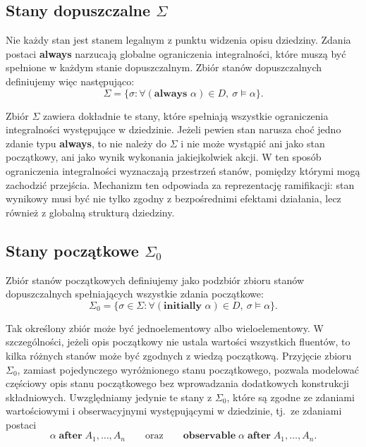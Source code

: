 \documentclass[11pt,a4paper]{article}
\theoremstyle{definition}
\begin{document}
\subsection{Stany dopuszczalne \texorpdfstring{$\Sigma$}{Sigma}}
\label{sec:stany-dopuszczalne}

Nie każdy stan jest stanem legalnym z punktu widzenia opisu dziedziny. Zdania postaci \textbf{always} narzucają globalne ograniczenia integralności, które muszą być spełnione w każdym stanie dopuszczalnym. Zbiór stanów dopuszczalnych definiujemy więc następująco:
\[
\Sigma = \{\sigma : \forall (\textbf{always }\alpha)\in D,\ \sigma \models \alpha\}.
\]

Zbiór $\Sigma$ zawiera dokładnie te stany, które spełniają wszystkie ograniczenia integralności występujące w dziedzinie. Jeżeli pewien stan narusza choć jedno zdanie typu \textbf{always}, to nie należy do $\Sigma$ i nie może wystąpić ani jako stan początkowy, ani jako wynik wykonania jakiejkolwiek akcji. W ten sposób ograniczenia integralności wyznaczają przestrzeń stanów, pomiędzy którymi mogą zachodzić przejścia. Mechanizm ten odpowiada za reprezentację ramifikacji: stan wynikowy musi być nie tylko zgodny z bezpośrednimi efektami działania, lecz również z globalną strukturą dziedziny.

\subsection{Stany początkowe \texorpdfstring{$\Sigma_0$}{Sigma\_0}}
\label{sec:stany-poczatkowe}

Zbiór stanów początkowych definiujemy jako podzbiór zbioru stanów dopuszczalnych spełniających wszystkie zdania początkowe:
\[
\Sigma_0 = \{\sigma \in \Sigma : \forall (\textbf{initially }\alpha)\in D,\ \sigma \models \alpha\}.
\]

Tak określony zbiór może być jednoelementowy albo wieloelementowy. W szczególności, jeżeli opis początkowy nie ustala wartości wszystkich fluentów, to kilka różnych stanów może być zgodnych z wiedzą początkową. Przyjęcie zbioru $\Sigma_0$, zamiast pojedynczego wyróżnionego stanu początkowego, pozwala modelować częściowy opis stanu początkowego bez wprowadzania dodatkowych konstrukcji składniowych. Uwzględniamy jedynie te stany z $\Sigma_0$, które są zgodne ze zdaniami wartościowymi i obserwacyjnymi występującymi w dziedzinie, tj.\ ze zdaniami postaci
\[
\alpha \;\textbf{after}\; A_1,\dots,A_n
\qquad\text{oraz}\qquad
\textbf{observable}\; \alpha \;\textbf{after}\; A_1,\dots,A_n.
\]
\end{document}

